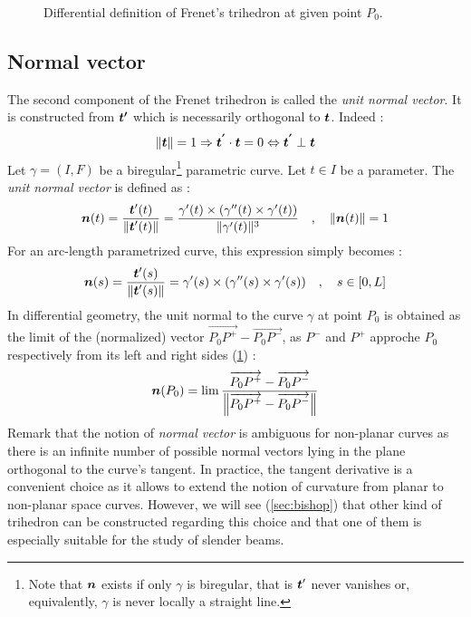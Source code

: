 \begin{figure}[t]
     \centering
     \caption{Differential definition of Frenet's trihedron at given point $P_0$.}
     \label{fig:3_1}
\end{figure}

\subsection{Normal vector}
The second component of the Frenet trihedron is called the \emph{unit normal vector}. It is constructed from $\boldsymbol{t'}$ which is necessarily orthogonal to $\boldsymbol{t}$. Indeed :
\begin{equation}
	\|\boldsymbol{t}\|=1 \Rightarrow \boldsymbol{t^{'}} \cdot  \boldsymbol{t} = 0 \Leftrightarrow  \boldsymbol{t^{'}} \perp \boldsymbol{t}
\end{equation}
Let $\gamma = (I,F)$ be a biregular\footnote{
Note that $\boldsymbol{n}$ exists if only $\gamma$ is biregular, that is $\boldsymbol{t}'$ never vanishes or, equivalently, $\gamma$ is never locally a straight line.} parametric curve. 
Let $t \in I$ be a parameter. The \emph{unit normal vector} is defined as :
\begin{equation}
	\boldsymbol{n}(t) = \frac{\boldsymbol{t}'(t)}{\|\boldsymbol{t}'(t)\|} 
	= \frac{\gamma'(t) \times (\gamma''(t) \times \gamma'(t))}{\|\gamma'(t)\|^3}
	\quad,\quad
	\|\boldsymbol{n}(t)\|=1
\end{equation}
For an arc-length parametrized curve, this expression simply becomes :
\begin{equation}
	\boldsymbol{n}(s) = \frac{\boldsymbol{t}'(s)}{\|\boldsymbol{t}'(s)\|} 
	= \gamma'(s) \times (\gamma''(s) \times \gamma'(s))
	\quad,\quad
	s \in [0,L]
\end{equation}
In differential geometry, the unit normal to the curve $\gamma$ at point $P_0$ is obtained as the limit of the (normalized) vector $\overrightarrow{P_0 P^+}-\overrightarrow{P_0 P^-}$, as $P^-$ and $P^+$ approche $P_0$ respectively from its left and right sides (\cref{fig:3_1}) :
\begin{equation}
	\boldsymbol{n}(P_0)
	= \lim_{}\frac{\overrightarrow{P_0 P^+}-\overrightarrow{P_0 P^-}}{\left\|\overrightarrow{P_0 P^+}-\overrightarrow{P_0 P^-}\right\|}
\label{eq:3_4}
\end{equation}
Remark that the notion of \emph{normal vector} is ambiguous for non-planar curves as there is an infinite number of possible normal vectors lying in the plane orthogonal to the curve's tangent. In practice, the tangent derivative is a convenient choice as it allows to extend the notion of curvature from planar to non-planar space curves. However, we will see (\cref{sec:bishop}) that other kind of trihedron can be constructed regarding this choice and that one of them is especially suitable for the study of slender beams.

